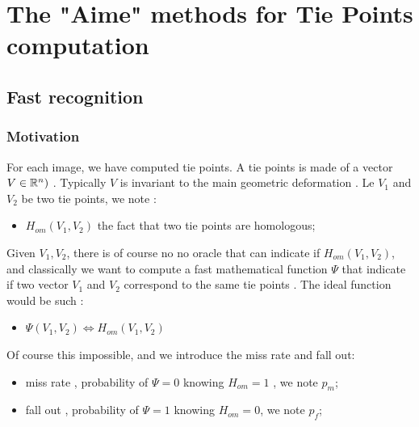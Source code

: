 

\chapter{The "Aime" methods for Tie Points computation}




\section{Fast recognition}


\subsection{Motivation}
For each image, we have computed tie points. A tie points is made
of a vector $V \in \mathbb{R}^n)$ . Typically $V$ is invariant
to the main geometric deformation .  Le  $V_1$ and $V_2$
be two tie points, we note :

\begin{itemize}
   \item  $H_{om}(V_1,V_2) $ the fact that two tie points are homologous;
\end{itemize}

Given $V_1,V_2$, there is of course no no oracle that can indicate if  $H_{om}(V_1,V_2)$,
and classically we want to compute  a fast mathematical function $\Psi $ that indicate if two vector $V_1$ and $V_2$
correspond to the same tie points .  The ideal function would be such :

\begin{itemize}
   \item  $\Psi(V_1,V_2)  \iff H_{om}(V_1,V_2)$
\end{itemize}


Of course this impossible, and we introduce the miss rate  and fall out:

\begin{itemize}
   \item   miss rate , probability of $\Psi=0$ knowing $H_{om}=1$ , we note $p_m$;
   \item   fall out , probability of $\Psi=1$ knowing $H_{om}=0$, we note $p_f$;
\end{itemize}

